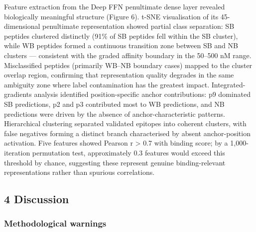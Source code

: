 \documentclass[10pt]{article}
\begin{document}
Feature extraction from the Deep FFN penultimate dense layer revealed
biologically meaningful structure (Figure 6). t-SNE visualisation of its
45-dimensional penultimate representation showed partial class
separation: SB peptides clustered distinctly (91\% of SB peptides fell
within the SB cluster), while WB peptides formed a continuous transition
zone between SB and NB clusters --- consistent with the graded affinity
boundary in the 50--500 nM range. Misclassified peptides (primarily
WB--NB boundary cases) mapped to the cluster overlap region, confirming
that representation quality degrades in the same ambiguity zone where
label contamination has the greatest impact. Integrated-gradients
analysis identified position-specific anchor contributions: p9 dominated
SB predictions, p2 and p3 contributed most to WB predictions, and NB
predictions were driven by the absence of anchor-characteristic
patterns. Hierarchical clustering separated validated epitopes into
coherent clusters, with false negatives forming a distinct branch
characterised by absent anchor-position activation. Five features showed
Pearson r \textgreater{} 0.7 with binding score; by a 1,000-iteration
permutation test, approximately 0.3 features would exceed this threshold
by chance, suggesting these represent genuine binding-relevant
representations rather than spurious correlations.

\subsection{4 Discussion}\label{discussion}

\subsubsection{Methodological warnings}\label{methodological-warnings}
\end{document}
